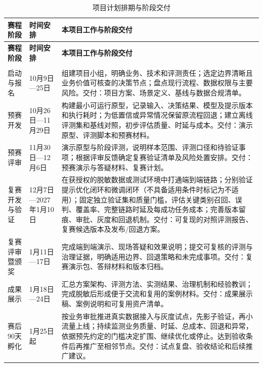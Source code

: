 \documentclass[UTF8,a4paper,11pt,fontset=windows]{ctexart}
\begin{document}
{\small\setlength{\tabcolsep}{4pt}\renewcommand{\arraystretch}{1.28}
\begin{longtable}{>{\raggedright\arraybackslash}p{0.17\dimexpr\linewidth-6\tabcolsep\relax}>{\raggedright\arraybackslash}p{0.24\dimexpr\linewidth-6\tabcolsep\relax}>{\raggedright\arraybackslash}p{0.59\dimexpr\linewidth-6\tabcolsep\relax}}
\caption{项目计划排期与阶段交付}\label{tab:project-schedule}\\
\toprule
\textbf{赛程阶段} & \textbf{时间安排} & \textbf{本项目工作与阶段交付} \\
\midrule
\endfirsthead
\toprule
\textbf{赛程阶段} & \textbf{时间安排} & \textbf{本项目工作与阶段交付} \\
\midrule
\endhead
\midrule\multicolumn{3}{r}{\scriptsize\color{Muted}续下页}\\\endfoot
\bottomrule\endlastfoot
启动与报名 & 10月9日—25日 & 组建项目小组，明确业务、技术和评测责任；选定边界清晰且业务价值可核查的决策节点；盘点现行流程、数据权限与主要风险。交付：项目方案、场景定义、基线与数据合规清单。 \\
预赛开发 & 10月26日—11月29日 & 构建最小可运行原型，记录输入、决策结果、模型及提示版本和执行耗时；为低置信或异常情况保留原流程回退；建立离线评测集和基线对照，初步评估质量、时延与成本。交付：演示原型、评测脚本和预赛材料。 \\
预赛评审 & 11月30日—12月6日 & 演示原型与阶段评测，说明样本范围、评测口径和待验证事项；根据评审反馈确定复赛验证清单及风险处置安排。交付：预赛演示与答疑材料、复赛计划。 \\
复赛开发与验证 & 12月7日—2027年1月10日 & 在获授权的脱敏数据或测试环境中打通端到端链路；分别验证提示优化闭环和微调闭环（不具备适用条件时标记为不适用）；固定独立验证集和质量门槛，评估关键类别召回、误判、覆盖率、完整链路时延及每成功任务成本；完善版本留痕、审批、灰度和回退机制。交付：可复现的对照评测报告、复赛候选版本及发布/回退方案。 \\
复赛评审暨颁奖 & 1月11日—17日 & 完成端到端演示、现场答疑和效果说明；提交可复核的评测与治理证据，明确适用边界、回退策略和未完成事项。交付：复赛演示包、答辩材料和版本归档。 \\
成果展示 & 1月18日—24日 & 汇总方案架构、评测方法、实测结果、治理机制和经验教训；完成脱敏后形成便于交流和复用的案例材料。交付：成果展示稿、案例说明和可复用资产清单。 \\
赛后90天孵化 & 1月25日起 & 按业务审批推进真实数据接入与灰度试点，先影子验证，再小流量上线；持续监测业务质量、时延、总成本、回退和异常，依据预先约定的门槛决定扩围、继续优化或停止。达到验收条件后再推广至相邻节点。交付：试点复盘、验收结论和后续推广建议。 \\
\end{longtable}}
\end{document}
